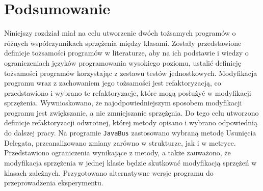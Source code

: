 \section{Podsumowanie}

Niniejszy rozdział miał na celu utworzenie dwóch tożsamych programów o różnych współczynnikach sprzężenia między
klasami.
Zostały przedstawione definicje tożsamości programów w literaturze, aby na ich podstawie i wiedzy o ograniczeniach
języków programowania wysokiego poziomu, ustalić definicję tożsamości programów korzystając z zestawu testów
jednostkowych.
Modyfikacja programu wraz z zachowaniem jego tożsamości jest refaktoryzacją, co przedstawiono i wybrano te
refaktoryzacje, które mogą posłużyć w modyfikacji sprzężenia.
Wywnioskowano, że najodpowiedniejszym sposobem modyfikacji programu jest zwiększanie, a nie zmniejszanie sprzężęnia.
Do tego celu utworzono definicje refaktoryzacji odwrotnej, której metody opisano i wybrano odpowiednią do
dalszej pracy.
Na programie \texttt{JavaBus} zastosowano wybraną metodę Usunięcia Delegata, przeanalizowano zmiany zarówno w
strukturze, jak i w metryce.
Przedstawiono ograniczenia wynikające z metody, a także zauważono, że modyfikacja sprzężenia w jednej klasie będzie
skutkować modyfikacją sprzężeń w klasach zależnych.
Przygotowano alternatywne wersje programu do przeprowadzenia eksperymentu.
